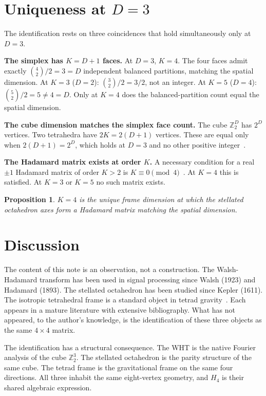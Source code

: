 \documentclass[11pt]{article}
\newtheorem{proposition}[theorem]{Proposition}
\begin{document}
\section{Uniqueness at $D=3$}

The identification rests on three coincidences that hold
simultaneously only at $D=3$.

\textbf{The simplex has $K=D+1$ faces.}  At $D=3$, $K=4$.  The
four faces admit exactly $\binom{4}{2}/2=3=D$ independent balanced
partitions, matching the spatial dimension.  At $K=3$ ($D=2$):
$\binom{3}{2}/2=3/2$, not an integer.  At $K=5$ ($D=4$):
$\binom{5}{2}/2=5\neq 4=D$.  Only at $K=4$ does the
balanced-partition count equal the spatial dimension.

\textbf{The cube dimension matches the simplex face count.}  The
cube $\mathbb Z_2^D$ has $2^D$ vertices.  Two tetrahedra have
$2K=2(D+1)$ vertices.  These are equal only when
$2(D+1)=2^D$, which holds at $D=3$ and no other positive
integer~\cite{NelsonA}.

\textbf{The Hadamard matrix exists at order $K$.}  A necessary
condition for a real $\pm1$ Hadamard matrix of order $K>2$ is
$K\equiv 0\pmod{4}$~\cite{Hadamard}.  At $K=4$ this is satisfied.
At $K=3$ or $K=5$ no such matrix exists.

\begin{proposition}
$K=4$ is the unique frame dimension at which the stellated
octahedron axes form a Hadamard matrix matching the spatial
dimension.
\end{proposition}


\section{Discussion}

The content of this note is an observation, not a construction.
The Walsh-Hadamard transform has been used in signal processing
since Walsh (1923) and Hadamard (1893).  The stellated octahedron
has been studied since Kepler (1611).  The isotropic tetrahedral
frame is a standard object in tetrad
gravity~\cite{MTW,Hehl1976}.  Each appears in a mature literature
with extensive bibliography.  What has not appeared, to the
author's knowledge, is the identification of these three objects as
the same $4\times 4$ matrix.

The identification has a structural consequence.  The WHT is the
native Fourier analysis of the cube $\mathbb Z_2^3$.  The
stellated octahedron is the parity structure of the same cube.
The tetrad frame is the gravitational frame on the same four
directions.  All three inhabit the same eight-vertex geometry,
and $H_4$ is their shared algebraic expression.
\end{document}
